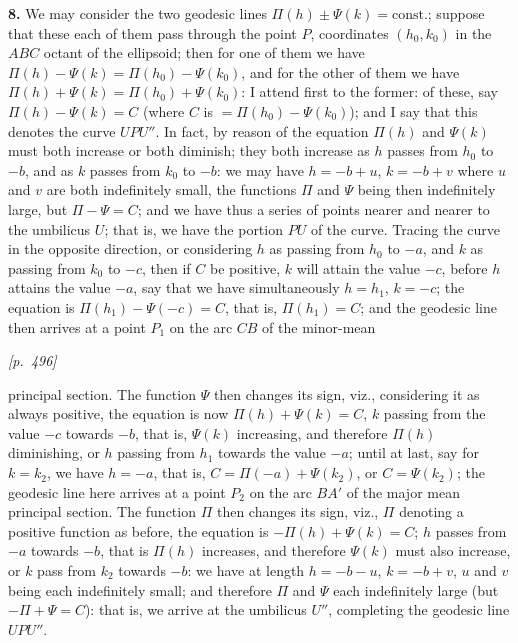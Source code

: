 \documentclass[11pt]{article}
\begin{document}
\textbf{8.} We may consider the two geodesic lines
$\Pi(h)\pm\Psi(k)=\mathrm{const.}$; suppose that these each of them pass
through the point $P$, coordinates $(h_{0},k_{0})$ in the $ABC$ octant of
the ellipsoid; then for one of them we have
$\Pi(h)-\Psi(k)=\Pi(h_{0})-\Psi(k_{0})$, and for the other of them we have
$\Pi(h)+\Psi(k)=\Pi(h_{0})+\Psi(k_{0})$: I attend first to the former: of
these, say $\Pi(h)-\Psi(k)=C$ (where $C$ is $=\Pi(h_{0})-\Psi(k_{0})$); and
I say that this denotes the curve $UPU''$. In fact, by reason of the
equation $\Pi(h)$ and $\Psi(k)$ must both increase or both diminish; they
both increase as $h$ passes from $h_{0}$ to $-b$, and as $k$ passes from
$k_{0}$ to $-b$: we may have $h=-b+u$, $k=-b+v$ where $u$ and $v$ are
both indefinitely small, the functions $\Pi$ and $\Psi$ being then
indefinitely large, but $\Pi-\Psi=C$; and we have thus a series of points
nearer and nearer to the umbilicus $U$; that is, we have the portion $PU$
of the curve. Tracing the curve in the opposite direction, or considering
$h$ as passing from $h_{0}$ to $-a$, and $k$ as passing from $k_{0}$ to
$-c$, then if $C$ be positive, $k$ will attain the value $-c$, before $h$
attains the value $-a$, say that we have simultaneously $h=h_{1}$, $k=-c$;
the equation is $\Pi(h_{1})-\Psi(-c)=C$, that is, $\Pi(h_{1})=C$; and the
geodesic line then arrives at a point $P_{1}$ on the arc $CB$ of the
minor-mean

\medskip

\noindent\textit{[p.~496]}

\medskip

\noindent
principal section. The function $\Psi$ then changes its sign, viz.,
considering it as always positive, the equation is now
$\Pi(h)+\Psi(k)=C$, $k$ passing from the value $-c$ towards $-b$, that
is, $\Psi(k)$ increasing, and therefore $\Pi(h)$ diminishing, or $h$
passing from $h_{1}$ towards the value $-a$; until at last, say for
$k=k_{2}$, we have $h=-a$, that is, $C=\Pi(-a)+\Psi(k_{2})$, or
$C=\Psi(k_{2})$; the geodesic line here arrives at a point $P_{2}$ on the
arc $BA'$ of the major mean principal section. The function $\Pi$ then
changes its sign, viz., $\Pi$ denoting a positive function as before, the
equation is $-\Pi(h)+\Psi(k)=C$; $h$ passes from $-a$ towards $-b$, that
is $\Pi(h)$ increases, and therefore $\Psi(k)$ must also increase, or $k$
pass from $k_{2}$ towards $-b$: we have at length $h=-b-u$, $k=-b+v$,
$u$ and $v$ being each indefinitely small; and therefore $\Pi$ and $\Psi$
each indefinitely large (but $-\Pi+\Psi=C$): that is, we arrive at the
umbilicus $U''$, completing the geodesic line $UPU''$.
\end{document}
